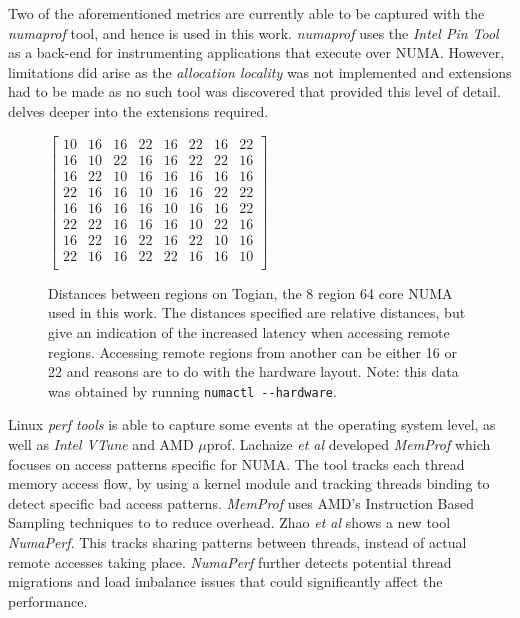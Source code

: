 \documentclass{paper}\usepackage{graphicx}
\makeatletter
\newcommand\footnoteref[1]{\protected@xdef\@thefnmark{\ref{#1}}\@footnotemark}
\makeatother
\begin{document}
Two of the aforementioned metrics are currently able to be captured with the \textit{numaprof}\cite{DBLP:conf/europar/ValatB18} tool, and hence is used in this work. \textit{numaprof} uses the \textit{Intel Pin Tool}\cite{DBLP:conf/pldi/LukCMPKLWRH05} as a back-end for instrumenting applications that execute over NUMA. However, limitations did arise as the \textit{allocation locality} was not implemented and extensions had to be made as no such tool was discovered that provided this level of detail.  delves deeper into the extensions required.

\begin{figure}[!htb]
    \centering
    $\begin{bmatrix}
    10 & 16 & 16 & 22 & 16 & 22 & 16 & 22 \\
    16 & 10 & 22 & 16 & 16 & 22 & 22 & 16 \\
    16 & 22 & 10 & 16 & 16 & 16 & 16 & 16 \\
    22 & 16 & 16 & 10 & 16 & 16 & 22 & 22 \\
    16 & 16 & 16 & 16 & 10 & 16 & 16 & 22 \\
    22 & 22 & 16 & 16 & 16 & 10 & 22 & 16 \\
    16 & 22 & 16 & 22 & 16 & 22 & 10 & 16 \\
    22 & 16 & 16 & 22 & 22 & 16 & 16 & 10 \\
    \end{bmatrix}$
    \caption{Distances between regions on Togian, the 8 region 64 core NUMA used in this work. The distances specified are relative distances, but give an indication of the increased latency when accessing remote regions. Accessing remote regions from another can be either 16 or 22 and reasons are to do with the hardware layout. Note: this data was obtained by running \lstinline{numactl --hardware}.}
    \label{fig:distance}
\end{figure}

Linux \textit{perf tools}\footnoteref{perf} is able to capture some events at the operating system level, as well as \textit{Intel VTune} and AMD $\mu$prof. Lachaize \textit{et al} \cite{DBLP:conf/usenix/LachaizeLQ12} developed \textit{MemProf} which focuses on access patterns specific for NUMA. The tool tracks each thread memory access flow, by using a kernel module and tracking threads binding to detect specific bad access patterns. \textit{MemProf} uses AMD's Instruction Based Sampling\cite{drongowski2007instruction} techniques to to reduce overhead. Zhao \textit{et al} \cite{DBLP:journals/corr/abs-2102-05204} shows a new tool \textit{NumaPerf}. This tracks sharing patterns between threads, instead of actual remote accesses taking place. \textit{NumaPerf} further detects potential thread migrations and load imbalance issues that could significantly affect the performance.
\end{document}
